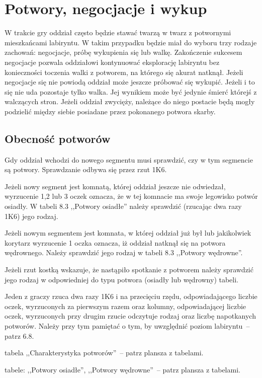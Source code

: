 \section{Potwory, negocjacje i wykup}

W trakcie gry oddział często będzie stawać twarzą w twarz z potwornymi mieszkańcami labiryntu.
W takim przypadku będzie miał do wyboru trzy rodzaje zachowań: negocjacje, próbę wykupienia się lub walkę.
Zakończenie sukcesem negocjacje pozwala oddziałowi kontynuować eksplorację labiryntu bez konieczności toczenia walki z potworem, na którego się akurat natknął.
Jeżeli negocjacje się nie powiodą oddział może jeszcze próbować się wykupić.
Jeżeli i to się nie uda pozostaje tylko walka.
Jej wynikiem może być jedynie śmierć którejś z walczących stron.
Jeżeli oddział zwycięży, należące do niego postacie będą mogły podzielić między siebie posiadane przez pokonanego potwora skarby.

\subsection{Obecność potworów}

Gdy oddział wchodzi do nowego segmentu musi sprawdzić, czy w tym segmencie są potwory.
Sprawdzanie odbywa się przez rzut 1K6.

Jeżeli nowy segment jest komnatą, której oddział jeszcze nie odwiedzał, wyrzucenie 1,2 lub 3 oczek oznacza, że w tej komnacie ma swoje legowisko potwór osiadły.
W tabeli 8.3 ,,Potwory osiadłe'' należy sprawdzić (rzucając dwa razy 1K6) jego rodzaj.

Jeżeli nowym segmentem jest komnata, w której oddział już był lub jakikolwiek korytarz wyrzucenie 1 oczka oznacza, iż oddział natknął się na potwora wędrownego.
Należy sprawdzić jego rodzaj w tabeli 8.3 ,,Potwory wędrowne''.

Jeżeli rzut kostką wskazuje, że nastąpiło spotkanie z potworem należy sprawdzić jego rodzaj w odpowiedniej do typu potwora (osiadły lub wędrowny) tabeli.

Jeden z graczy rzuca dwa razy 1K6 i na przecięciu rzędu, odpowiadającego liczbie oczek, wyrzuconych za pierwszym razem oraz kolumny, odpowiadającej liczbie oczek, wyrzuconych przy drugim rzucie odczytuje rodzaj oraz liczbę napotkanych potworów.
Należy przy tym pamiętać o tym, by uwzględnić poziom labiryntu~-- patrz 6.8.

tabela ,,Charakterystyka potworów''~-- patrz plansza z tabelami.

tabele: ,,Potwory osiadłe'', ,,Potwory wędrowne''~-- patrz plansza z tabelami.

